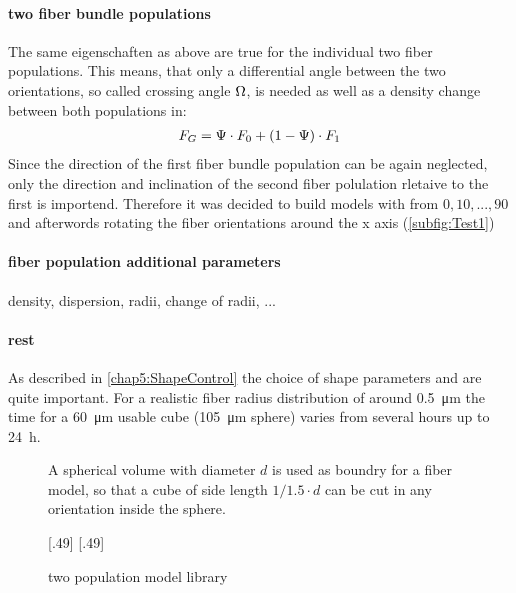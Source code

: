 \paragraph{two fiber bundle populations}
The same eigenschaften as above are true for the individual two fiber populations. This means, that only a differential angle between the two orientations, so called crossing angle $\textnormal{$\Omega$}$, is needed as well as a density change between both populations \modelPsi in:
\begin{align}
    F_G = \textnormal{$\Psi$} \cdot F_0 + (1-\textnormal{$\Psi$}) \cdot F_1
\end{align}
% 
Since the direction of the first fiber bundle population can be again neglected, only the direction and inclination of the second fiber polulation rletaive to the first is importend. Therefore it was decided to build models with \modelOmega from ${0,10,...,90}$ and afterwords rotating the fiber orientations around the x axis (\cref{subfig:Test1})
% 
\paragraph{fiber population additional parameters}
density, dispersion, radii, change of radii, ...
% 
\paragraph{rest}
% 
As described in \cref{chap5:ShapeControl} the choice of shape parameters \segLength and \segRadius are quite important. For a realistic fiber radius distribution of around \SI{0.5}{\micro\meter} the time for a \SI{60}{\micro\meter} usable cube (\SI{105}{\micro\meter} sphere) varies from several hours up to \SI{24}{\hour}.
% 
\begin{figure}[!t]
\centering
\caption[]{A spherical volume with diameter $d$ is used as boundry for a fiber model, so that a cube of side length $1/1.5 \cdot d$ can be cut in any orientation inside the sphere.}
\end{figure}
% 
\begin{figure}[!t]
\centering
\def\tikzwidth{0.5*\textwidth}
[.49\textwidth]{
}\hfill
{}[.49\textwidth]{
}
\caption{two population model library}
\label{fig:twomodelpop}
\end{figure}
% 
% 
